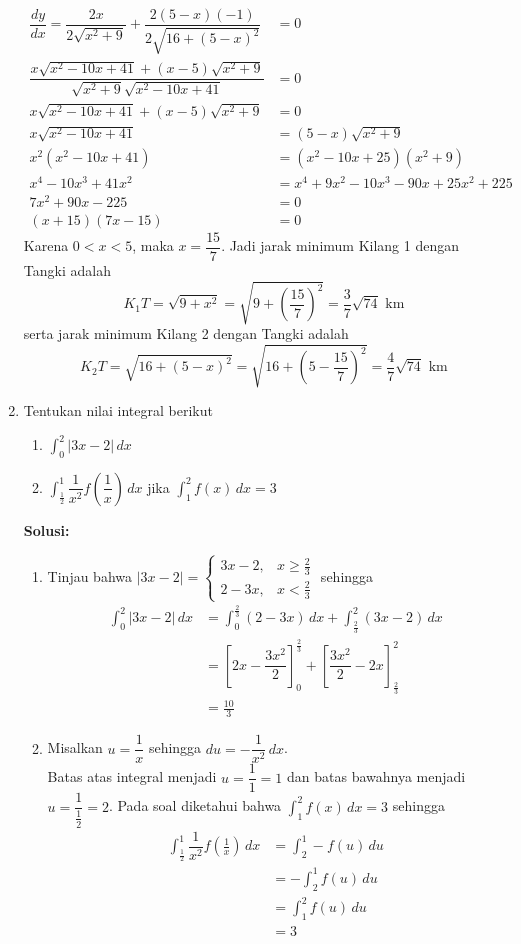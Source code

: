 \documentclass{article}
\begin{document}
\begin{enumerate}
	\begin{align*}
	\dfrac{dy}{dx} = \dfrac{2x}{2\sqrt{x^2+9}} + \dfrac{2(5-x)(-1)}{2\sqrt{16+(5-x)^2}} &= 0\\
	\dfrac{x\sqrt{x^2-10x+41}+(x-5)\sqrt{x^2+9}}{\sqrt{x^2+9}\sqrt{x^2-10x+41}} &= 0\\
	x\sqrt{x^2-10x+41}+(x-5)\sqrt{x^2+9} &= 0\\
	x\sqrt{x^2-10x+41} &= (5-x)\sqrt{x^2+9} \\
	x^2(x^2-10x+41) &= (x^2-10x+25)(x^2+9)\\
	x^4-10x^3+41x^2 &= x^4+9x^2-10x^3-90x+25x^2+225 \\
	7x^2+90x-225 &= 0\\
	(x+15)(7x-15) &= 0 
	\end{align*}
	Karena $0<x<5$, maka $x=\dfrac{15}{7}$. Jadi jarak minimum Kilang 1 dengan Tangki adalah $$K_1T=\sqrt{9+x^2}=\sqrt{9+\left(\frac{15}{7}\right)^2}=\dfrac{3}{7}\sqrt{74} \text{ km}$$
	serta jarak minimum Kilang 2 dengan Tangki adalah $$K_2T=\sqrt{16+(5-x)^2} = \sqrt{16+\left(5-\frac{15}{7}\right)^2} = \dfrac{4}{7}\sqrt{74} \text{ km}$$
	\item Tentukan nilai integral berikut
	\begin{enumerate}
		\item $\displaystyle \int_0^2 |3x-2| \, dx$
		\item $\displaystyle \int_{\frac{1}{2}}^1 \dfrac{1}{x^2}f\left(\dfrac{1}{x}\right) \, dx$ jika $\displaystyle \int_1^2 f(x) \, dx =3$
	\end{enumerate}
	\textbf{Solusi:}
	\begin{enumerate}
		\item Tinjau bahwa $|3x-2| = \begin{cases} 3x-2, &x\geq\frac{2}{3}\\
		2-3x, &x<\frac{2}{3} \end{cases}$ sehingga 
		\begin{align*}
		\int_0^2 |3x-2| \, dx &= \int_0^{\frac{2}{3}} (2-3x) \, dx + \int_{\frac{2}{3}}^2 (3x-2) \, dx \\
		&= \left[2x-\dfrac{3x^2}{2}\right]^{\frac{2}{3}}_0 + \left[\dfrac{3x^2}{2}-2x\right]_{\frac{2}{3}}^2\\
		&= \frac{10}{3}
		\end{align*}
		\item Misalkan $u = \dfrac{1}{x}$ sehingga $du = -\dfrac{1}{x^2} \, dx$. \\Batas atas integral menjadi $u=\dfrac{1}{1}=1$ dan batas bawahnya menjadi $u=\dfrac{1}{\frac{1}{2}}=2$. Pada soal diketahui bahwa $\displaystyle \int_1^2 f(x)\, dx =3$ sehingga 
		\begin{align*}
		\int_{\frac{1}{2}}^1 \dfrac{1}{x^2}f\left(\frac{1}{x}\right) \, dx &= \int_2^1 -f(u) \, du\\
		&= -\int_2^1 f(u) \,du\\
		&= \int_1^2 f(u) \, du \\
		&= 3
		\end{align*}
	\end{enumerate}
\end{enumerate}
\newpage
\end{document}
